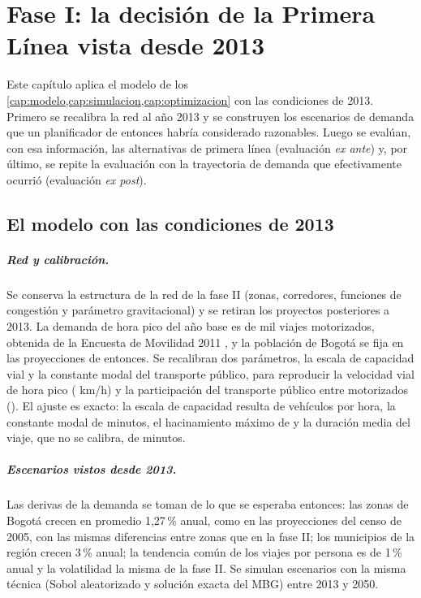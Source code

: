 \chapter{Fase I: la decisión de la Primera Línea vista desde 2013}\label{cap:evaluacion2013}

Este capítulo aplica el modelo de los \cref{cap:modelo,cap:simulacion,cap:optimizacion} con las
condiciones de 2013. Primero se recalibra la red al año 2013 y se construyen los escenarios de demanda
que un planificador de entonces habría considerado razonables. Luego se evalúan, con esa información,
las alternativas de primera línea (evaluación \emph{ex ante}) y, por último, se repite la evaluación
con la trayectoria de demanda que efectivamente ocurrió (evaluación \emph{ex post}).

\section{El modelo con las condiciones de 2013}

\paragraph{Red y calibración.} Se conserva la estructura de la red de la fase II (zonas, corredores,
funciones de congestión y parámetro gravitacional) y se retiran los proyectos posteriores a 2013. La
demanda de hora pico del año base es de \ViajesPicoDosMilTrece{} mil viajes motorizados, obtenida de
la Encuesta de Movilidad 2011 \citep{sdm2012}, y la población de Bogotá se fija en las proyecciones
de entonces. Se recalibran dos parámetros, la escala de capacidad vial y la constante modal del
transporte público, para reproducir la velocidad vial de hora pico (\VelDosMilTrece{} km/h) y la
participación del transporte público entre motorizados (\PartTPDosMilTrece). El ajuste es exacto: la
escala de capacidad resulta de \EscalaDosMilTrece{} vehículos por hora, la constante modal de
\ASCDosMilTrece{} minutos, el hacinamiento máximo de \HacDosMilTrece{} y la duración media del viaje,
que no se calibra, de \TiempoDosMilTrece{} minutos.

\paragraph{Escenarios vistos desde 2013.} Las derivas de la demanda se toman de lo que se esperaba
entonces: las zonas de Bogotá crecen en promedio 1,27\,\% anual, como en las proyecciones del censo de
2005, con las mismas diferencias entre zonas que en la fase II; los municipios de la región crecen
3\,\% anual; la tendencia común de los viajes por persona es de 1\,\% anual y la volatilidad la misma
de la fase II. Se simulan \NFaseUno{} escenarios con la misma técnica (Sobol aleatorizado y solución
exacta del MBG) entre 2013 y 2050.

